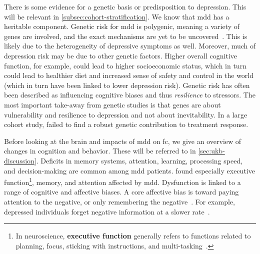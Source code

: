 There is some evidence for a genetic basis or predisposition to depression.
This will be relevant in \cref{subsec:cohort-stratification}.
We know that \gls{mdd} has a heritable component.
Genetic risk for \gls{mdd} is polygenic, meaning a variety of genes are involved, and the exact mechanisms are yet to be uncovered~\parencite{Hyman2014}.
This is likely due to the heterogeneity of depressive symptoms as well.
Moreover, much of depression risk may be due to other genetic factors.
Higher overall cognitive function, for example, could lead to higher socioeconomic status, which in turn could lead to healthier diet and increased sense of safety and control in the world (which in turn have been linked to lower depression risk).
Genetic risk has often been described as influencing cognitive biases and thus \emph{resilience} to stressors.
The most important take-away from genetic studies is that genes are about vulnerability and resilience to depression and not about inevitability.
%
In a large cohort study, \textcite{Garcia-Gonzalez2017} failed to find a robust genetic contribution to treatment response.

Before looking at the brain and impacts of \gls{mdd} on \gls{fc}, we give an overview of changes in cognition and behavior.
These will be referred to in \cref{sec:ukb-discussion}.
Deficits in memory systems, attention, learning, processing speed, and decision-making are common among \gls{mdd} patients.
\textcite{Rock2014} found especially executive function\footnote{In neuroscience, \textbf{executive function} generally refers to functions related to planning, focus, sticking with instructions, and multi-tasking~\parencite{Banich2009}.}, memory, and attention affected by \gls{mdd}.
Dysfunction is linked to a range of cognitive and affective biases.
A core affective bias is toward paying attention to the negative, or only remembering the negative~\parencite{Pulcu2017}.
For example, depressed individuals forget negative information at a slower rate~\parencite{Power2000, Joormann2010}.

